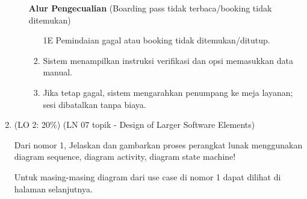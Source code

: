 \documentclass[a4paper]{article}
\begin{document}
\begin{enumerate}[itemsep=1em]
\begin{itemize}[itemsep=1em]
    \vspace{1em}
    \textbf{Alur Pengecualian} (Boarding pass tidak terbaca/booking tidak ditemukan)
    \begin{enumerate}[nosep]
      \item[1E] Pemindaian gagal atau booking tidak ditemukan/ditutup.
      \item Sistem menampilkan instruksi verifikasi dan opsi memasukkan data manual.
      \item Jika tetap gagal, sistem mengarahkan penumpang ke meja layanan; sesi dibatalkan tanpa biaya.
    \end{enumerate}

    \vspace{1em}

  \end{itemize}

  \item (LO 2: 20\%) (LN 07 topik - Design of Larger Software Elements)

  Dari nomor 1, Jelaskan dan gambarkan proses perangkat lunak menggunakan diagram sequence, diagram activity, diagram state machine!

  \vspace{1em}

  Untuk masing-masing diagram dari use case di nomor 1 dapat dilihat di halaman selanjutnya.

  \pagebreak


\end{enumerate}
\end{document}
